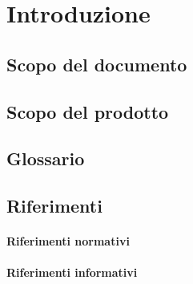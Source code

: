 \section{Introduzione}
	\subsection{Scopo del documento}

	\subsection{Scopo del prodotto}

	\subsection{Glossario}

	\subsection{Riferimenti}

		\paragraph{Riferimenti normativi}

		\paragraph{Riferimenti informativi}
		


